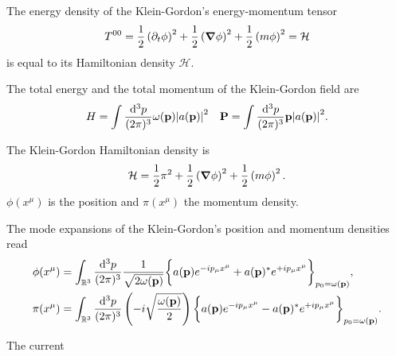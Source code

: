 \begin{lemma}
	The energy density of the Klein-Gordon's energy-momentum tensor
	\begin{equation*}
		T^{00}
		=
		\frac{1}{2}
		\left(\partial_t\phi\right)^2
		+
		\frac{1}{2}
		\left(\grad\phi\right)^2
		+
		\frac{1}{2}
		\left(m\phi\right)^2
		=
		\mathcal{H}
	\end{equation*}
	is equal to its Hamiltonian density $\mathcal{H}$.
\end{lemma}
\begin{lemma}\label{thm:kg_total_energy_momentum}
	The total energy and the total momentum of the Klein-Gordon field are
	\begin{align}
		H
		=
		\int\frac{\dd[3]{p}}{(2\pi)^3}
		\omega(\vb{p})\abs{a(\vb{p})}^2
		&&
		\vb{P}
		=
		\int\frac{\dd[3]{p}}{(2\pi)^3}
		\vb{p}\abs{a(\vb{p})}^2
		\label{eq:kg_energy_momentum}
		.
	\end{align}
\end{lemma}
\begin{definition}
	The Klein-Gordon Hamiltonian density is
	\begin{equation}
		\mathcal{H}
		=
		\frac{1}{2}
		\pi^2
		+
		\frac{1}{2}
		\left(\grad\phi\right)^2
		+
		\frac{1}{2}
		\left(m\phi\right)^2
		.
	\end{equation}
	$\phi(x^\mu)$ is the position and $\pi(x^\mu)$ the momentum density.
\end{definition}
\begin{lemma}
	The mode expansions of the Klein-Gordon's position and momentum densities read
	\begin{align}
		\phi(x^\mu)
		&=
		\int_{\mathbb{R}^3}\frac{\dd[3]{p}}{(2\pi)^3}
		\frac{1}{\sqrt{2\omega(\vb{p})}}
		\biggl\{
			a(\vb{p})
			e^{-ip_\mu x^\mu}
			+
			a(\vb{p})^*
			e^{+ip_\mu x^\mu}
		\biggr\}_{p_0=\omega(\vb{p})}
		,
		\\
		\pi(x^\mu)
		&=
		\int_{\mathbb{R}^3}\frac{\dd[3]{p}}{(2\pi)^3}
		\left(-i\sqrt{\frac{\omega(\vb{p})}{2}}\right)
		\biggl\{
			a(\vb{p})
			e^{-ip_\mu x^\mu}
			-
			a(\vb{p})^*
			e^{+ip_\mu x^\mu}
		\biggr\}_{p_0=\omega(\vb{p})}
		.
	\end{align}
\end{lemma}
\begin{definition}
	The current
\end{definition}